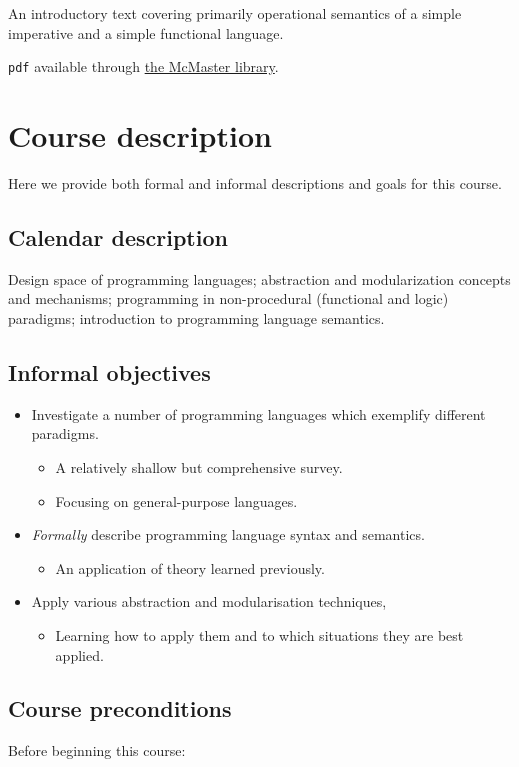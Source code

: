 \documentclass[11pt]{article}
\begin{document}
An introductory text covering primarily operational semantics
of a simple imperative and a simple functional language.

\texttt{pdf} available through
\href{http://discovery.mcmaster.ca/iii/encore/record/C\_\_Rb2200622}{the McMaster library}.

\section{Course description}
\label{sec:org95dde39}
Here we provide both formal and informal descriptions
and goals for this course.

\subsection{Calendar description}
\label{sec:org70ffe6c}
Design space of programming languages;
abstraction and modularization concepts and mechanisms;
programming in non-procedural (functional and logic) paradigms;
introduction to programming language semantics.

\subsection{Informal objectives}
\label{sec:org442bb01}
\begin{itemize}
\item Investigate a number of programming languages
which exemplify different paradigms.
\begin{itemize}
\item A relatively shallow but comprehensive survey.
\item Focusing on general-purpose languages.
\end{itemize}
\item \emph{Formally} describe programming language syntax and semantics.
\begin{itemize}
\item An application of theory learned previously.
\end{itemize}
\item Apply various abstraction and modularisation techniques,
\begin{itemize}
\item Learning how to apply them and
to which situations they are best applied.
\end{itemize}
\end{itemize}

\subsection{Course preconditions}
\label{sec:org734c0f2}
Before beginning this course:
\end{document}
